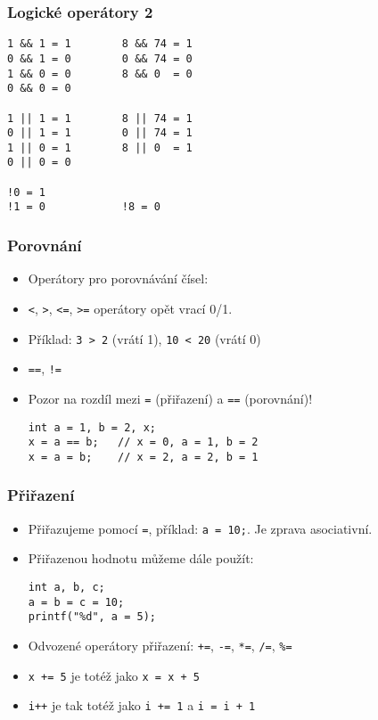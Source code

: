 \documentclass{beamer}
\newenvironment{itemizex}%
  {\large \begin{itemize}%
    \setlength{\itemsep}{8pt}%
    \setlength{\parskip}{8pt}}%
  {\end{itemize}}
\begin{document}
\begin{frame}[t,fragile]\frametitle{Logické operátory 2} 
  \begin{itemizex}
    \begin{verbatim} 
1 && 1 = 1        8 && 74 = 1
0 && 1 = 0        0 && 74 = 0
1 && 0 = 0        8 && 0  = 0
0 && 0 = 0

1 || 1 = 1        8 || 74 = 1
0 || 1 = 1        0 || 74 = 1
1 || 0 = 1        8 || 0  = 1
0 || 0 = 0

!0 = 1         
!1 = 0            !8 = 0
    \end{verbatim}
  \end{itemizex}
\end{frame}


\begin{frame}[t,fragile]\frametitle{Porovnání} 
  \begin{itemizex}
    \item Operátory pro porovnávání čísel:
    \item \texttt{<}, \texttt{>}, \texttt{<=}, \texttt{>=} operátory opět vrací 0/1. 
    \item Příklad: \texttt{3 > 2} (vrátí 1), \texttt{10 < 20} (vrátí 0)
    \item \texttt{==}, \texttt{!=}
    \item Pozor na rozdíl mezi \texttt{=} (přiřazení) a \texttt{==} (porovnání)!
    \begin{verbatim} 
int a = 1, b = 2, x;
x = a == b;   // x = 0, a = 1, b = 2
x = a = b;    // x = 2, a = 2, b = 1
    \end{verbatim}
  \end{itemizex}
\end{frame}


\begin{frame}[t,fragile]\frametitle{Přiřazení} 
  \begin{itemizex}
    \item Přiřazujeme pomocí \texttt{=}, příklad: \texttt{a = 10;}. Je zprava asociativní.
    \item Přiřazenou hodnotu můžeme dále použít:
\begin{verbatim} 
int a, b, c;
a = b = c = 10;
printf("%d", a = 5);
\end{verbatim}
  \item Odvozené operátory přiřazení: \texttt{+=}, \texttt{-=}, \texttt{*=}, \texttt{/=}, \texttt{\%=}
  \item \texttt{x += 5} je totéž jako \texttt{x = x + 5}
  \item \texttt{i++} je tak totéž jako \texttt{i += 1} a \texttt{i = i + 1}
  \end{itemizex}
\end{frame}
\end{document}
